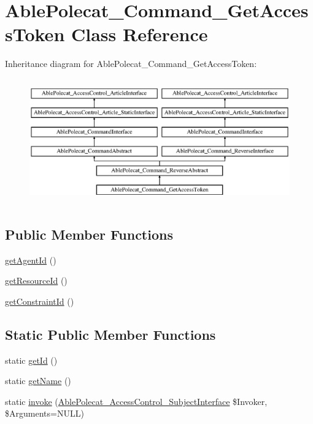 \hypertarget{class_able_polecat___command___get_access_token}{}\section{Able\+Polecat\+\_\+\+Command\+\_\+\+Get\+Access\+Token Class Reference}
\label{class_able_polecat___command___get_access_token}
Inheritance diagram for Able\+Polecat\+\_\+\+Command\+\_\+\+Get\+Access\+Token\+:\begin{figure}[H]
\begin{center}
\leavevmode
\includegraphics[height=5.419355cm]{class_able_polecat___command___get_access_token}
\end{center}
\end{figure}
\subsection*{Public Member Functions}
\begin{DoxyCompactItemize}
\item 
\hyperlink{class_able_polecat___command___get_access_token_a674eb8d41b003dc1c17e4296a8c9e9f8}{get\+Agent\+Id} ()
\item 
\hyperlink{class_able_polecat___command___get_access_token_a0ac412173b2b1d569ef90a1ac095ca5d}{get\+Resource\+Id} ()
\item 
\hyperlink{class_able_polecat___command___get_access_token_a3ec916f4d406909dd28fd67457e86c29}{get\+Constraint\+Id} ()
\end{DoxyCompactItemize}
\subsection*{Static Public Member Functions}
\begin{DoxyCompactItemize}
\item 
static \hyperlink{class_able_polecat___command___get_access_token_acfaa3a96d0cb5a4c0d4d710dcba41e9e}{get\+Id} ()
\item 
static \hyperlink{class_able_polecat___command___get_access_token_a4ef9bd37ba3ce8a13c1e8bcf4f72a630}{get\+Name} ()
\item 
static \hyperlink{class_able_polecat___command___get_access_token_a6821480fe527af0afdf3691d7cffad5f}{invoke} (\hyperlink{interface_able_polecat___access_control___subject_interface}{Able\+Polecat\+\_\+\+Access\+Control\+\_\+\+Subject\+Interface} \$Invoker, \$Arguments=N\+U\+L\+L)
\end{DoxyCompactItemize}
